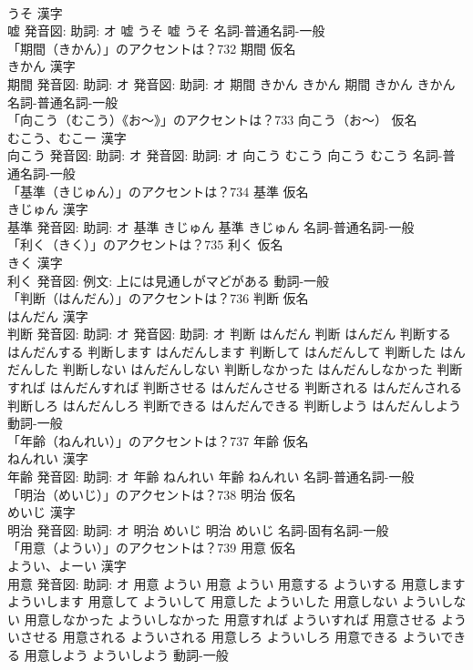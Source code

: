 \documentclass[8pt]{extreport}
\begin{document}
\begin{CJK}{UTF8}{min}
\\	うそ 漢字　
\\	嘘 発音図: 助詞: オ	嘘 うそ		嘘 うそ				名詞-普通名詞-一般 
\\	「期間（きかん）」のアクセントは？732	期間 仮名　
\\	きかん 漢字　
\\	期間 発音図: 助詞: オ 発音図: 助詞: オ	期間 きかん きかん		期間 きかん きかん				名詞-普通名詞-一般 
\\	「向こう（むこう）《お〜》」のアクセントは？733	向こう（お〜） 仮名　
\\	むこう、むこー 漢字　
\\	向こう 発音図: 助詞: オ 発音図: 助詞: オ	向こう むこう		向こう むこう				名詞-普通名詞-一般 
\\	「基準（きじゅん）」のアクセントは？734	基準 仮名　
\\	きじゅん 漢字　
\\	基準 発音図: 助詞: オ	基準 きじゅん		基準 きじゅん				名詞-普通名詞-一般 
\\	「利く（きく）」のアクセントは？735	利く 仮名　
\\	きく 漢字　
\\	利く 発音図: 例文: 上には見通しがマどがある							動詞-一般 
\\	「判断（はんだん）」のアクセントは？736	判断 仮名　
\\	はんだん 漢字　
\\	判断 発音図: 助詞: オ 発音図: 助詞: オ	判断 はんだん		判断 はんだん 判断する はんだんする 判断します はんだんします 判断して はんだんして 判断した はんだんした 判断しない はんだんしない 判断しなかった はんだんしなかった 判断すれば はんだんすれば 判断させる はんだんさせる 判断される はんだんされる 判断しろ はんだんしろ 判断できる はんだんできる 判断しよう はんだんしよう				動詞-一般 
\\	「年齢（ねんれい）」のアクセントは？737	年齢 仮名　
\\	ねんれい 漢字　
\\	年齢 発音図: 助詞: オ	年齢 ねんれい		年齢 ねんれい				名詞-普通名詞-一般 
\\	「明治（めいじ）」のアクセントは？738	明治 仮名　
\\	めいじ 漢字　
\\	明治 発音図: 助詞: オ	明治 めいじ		明治 めいじ				名詞-固有名詞-一般 
\\	「用意（ようい）」のアクセントは？739	用意 仮名　
\\	ようい、よーい 漢字　
\\	用意 発音図: 助詞: オ	用意 ようい		用意 ようい 用意する よういする 用意します よういします 用意して よういして 用意した よういした 用意しない よういしない 用意しなかった よういしなかった 用意すれば よういすれば 用意させる よういさせる 用意される よういされる 用意しろ よういしろ 用意できる よういできる 用意しよう よういしよう				動詞-一般 

\end{CJK}
\end{document}

